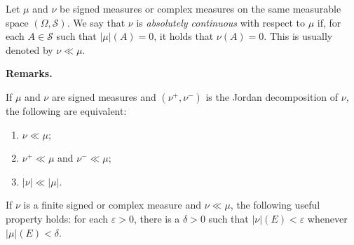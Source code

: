 \documentclass[12pt]{article}
\begin{document}
Let $\mu$ and $\nu$ be signed measures or complex measures on the same measurable space
$(\Omega, \mathscr{S})$. We say that $\nu$ is \emph{absolutely continuous}
with respect to $\mu$ if, for each $A\in \mathscr{S}$ such that $|\mu|(A)=0$,
it holds that $\nu(A)=0$. This is usually denoted by $\nu \ll \mu$.

\textbf{Remarks.}

If $\mu$ and $\nu$ are signed measures and $(\nu^+, \nu^-)$ is the Jordan decomposition of $\nu$, the following  are equivalent:
\begin{enumerate}
\item $\nu\ll\mu$;
\item $\nu^+\ll\mu$ and $\nu^-\ll\mu$;
\item $|\nu|\ll|\mu|$.
\end{enumerate}

If $\nu$ is a finite signed or complex measure and $\nu\ll\mu$, the following useful property holds: for each $\varepsilon>0$, there is a $\delta>0$ such that 
$|\nu|(E)<\varepsilon$ whenever $|\mu|(E)<\delta$.
\end{document}
